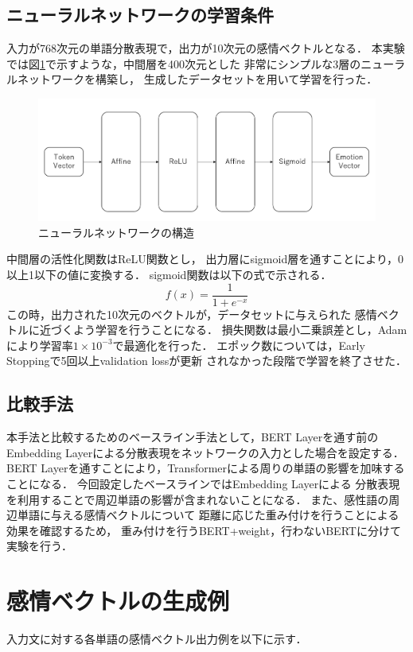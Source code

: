 	\subsection{ニューラルネットワークの学習条件}
		入力が768次元の単語分散表現で，出力が10次元の感情ベクトルとなる．
		本実験では図\ref{fig:network}で示すような，中間層を400次元とした
		非常にシンプルな3層のニューラルネットワークを構築し，
		生成したデータセットを用いて学習を行った．
		\begin{figure}[H]
			\centering
			\includegraphics[width=\linewidth]{./figure/network.png}
			\caption{ニューラルネットワークの構造}
			\label{fig:network}
		\end{figure}
		中間層の活性化関数はReLU関数とし，
		出力層にsigmoid層を通すことにより，0以上1以下の値に変換する．
		sigmoid関数は以下の式で示される．
		\begin{equation}
			f(x)=\frac{1}{1+e^{-x}}
		\end{equation}
		この時，出力された10次元のベクトルが，データセットに与えられた
		感情ベクトルに近づくよう学習を行うことになる．
		損失関数は最小二乗誤差とし，Adamにより学習率$1\times10^{-3}$で最適化を行った．
		エポック数については，Early Stoppingで5回以上validation lossが更新
		されなかった段階で学習を終了させた．
		
	\subsection{比較手法}
		本手法と比較するためのベースライン手法として，BERT Layerを通す前の
		Embedding Layerによる分散表現をネットワークの入力とした場合を設定する．
		BERT Layerを通すことにより，Transformerによる周りの単語の影響を加味することになる．
		今回設定したベースラインではEmbedding Layerによる
		分散表現を利用することで周辺単語の影響が含まれないことになる．
		また、感性語の周辺単語に与える感情ベクトルについて
		距離に応じた重み付けを行うことによる効果を確認するため，
		重み付けを行うBERT+weight，行わないBERTに分けて実験を行う．

\section{感情ベクトルの生成例}
	入力文に対する各単語の感情ベクトル出力例を以下に示す．
